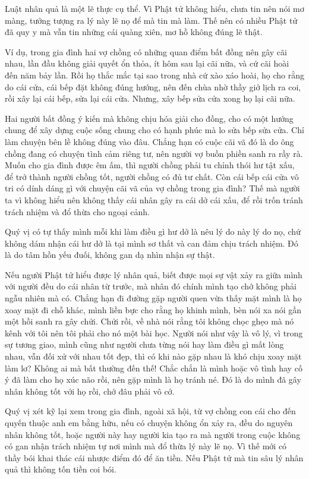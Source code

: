 \documentclass[
  12pt,
  oneside]{book}
\begin{document}
Luật nhân quả là một lẽ thực cụ thể. Vì Phật tử không hiểu, chưa tin nên nói mơ màng, tưởng tượng ra lý này lẽ nọ để mà tin mà làm. Thế nên có nhiều Phật tử đã quy y mà vẫn tin những cái quàng xiên, mơ hồ không đúng lẽ thật.

Ví dụ, trong gia đình hai vợ chồng có những quan điểm bất đồng nên gây cãi nhau, lần đầu không giải quyết ổn thỏa, ít hôm sau lại cãi nữa, và cứ cãi hoài đến năm bảy lần. Rồi họ thắc mắc tại sao trong nhà cứ xào xáo hoài, họ cho rằng do cái cửa, cái bếp đặt không đúng hướng, nên đến chùa nhờ thầy giở lịch ra coi, rồi xây lại cái bếp, sửa lại cái cửa. Nhưng, xây bếp sửa cửa xong họ lại cãi nữa.

Hai người bất đồng ý kiến mà không chịu hóa giải cho đồng, cho có một hướng chung để xây dựng cuộc sống chung cho có hạnh phúc mà lo sửa bếp sửa cửa. Chỉ làm chuyện bên lề không đúng vào đâu. Chẳng hạn có cuộc cãi vã đó là do ông chồng đang có chuyện tình cảm riêng tư, nên người vợ buồn phiền sanh ra rầy rà. Muốn cho gia đình được êm ấm, thì người chồng phải tu chỉnh thói hư tật xấu, để trở thành người chồng tốt, người chồng có đủ tư chất. Còn cái bếp cái cửa vô tri có dính dáng gì với chuyện cãi vã của vợ chồng trong gia đình? Thế mà người ta vì không hiểu nên không thấy cái nhân gây ra cái dở cái xấu, để rồi trốn tránh trách nhiệm và đổ thừa cho ngoại cảnh.

Quý vị có tự thấy mình mỗi khi làm điều gì hư dở là nêu lý do này lý do nọ, chứ không dám nhận cái hư dở là tại mình sơ thất và can đảm chịu trách nhiệm. Đó là do tâm hồn yếu đuối, không gan dạ nhìn nhận sự thật.

Nếu người Phật tử hiểu được lý nhân quả, biết được mọi sự vật xảy ra giữa mình với người đều do cái nhân từ trước, mà nhân đó chính mình tạo chớ không phải ngẫu nhiên mà có. Chẳng hạn đi đường gặp người quen vừa thấy mặt mình là họ xoay mặt đi chỗ khác, mình liền bực cho rằng họ khinh mình, bèn nói xa nói gần một hồi sanh ra gây chửi. Chửi rồi, về nhà nói rằng tôi không chọc ghẹo mà nó kênh với tôi nên tôi phải cho nó một bài học. Người nói như vậy là vô lý, vì trong sự tương giao, mình cũng như người chưa từng nói hay làm điều gì mất lòng nhau, vẫn đối xử với nhau tốt đẹp, thì có khi nào gặp nhau là khó chịu xoay mặt làm lơ? Không ai mà bất thường đến thế! Chắc chắn là mình hoặc vô tình hay cố ý đã làm cho họ xúc não rồi, nên gặp mình là họ tránh né. Đó là do mình đã gây nhân không tốt với họ rồi, chớ đâu phải vô cớ.

Quý vị xét kỹ lại xem trong gia đình, ngoài xã hội, từ vợ chồng con cái cho đến quyến thuộc anh em bằng hữu, nếu có chuyện không ổn xảy ra, đều do nguyên nhân không tốt, hoặc người này hay người kia tạo ra mà người trong cuộc không có gan nhận trách nhiệm tự nơi mình mà đổ thừa lý này lẽ nọ. Vì thế mới có thầy bói khai thác cái nhược điểm đó để ăn tiền. Nếu Phật tử mà tin sâu lý nhân quả thì không tốn tiền coi bói.
\end{document}

